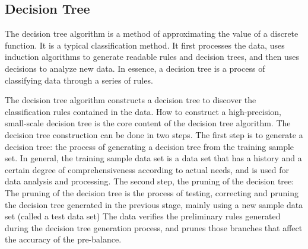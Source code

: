 \documentclass{article}
\begin{document}
\subsection{Decision Tree}
The decision tree algorithm is a method of approximating the value of a discrete function. It is a typical classification method. It first processes the data, uses induction algorithms to generate readable rules and decision trees, and then uses decisions to analyze new data. In essence, a decision tree is a process of classifying data through a series of rules.

The decision tree algorithm constructs a decision tree to discover the classification rules contained in the data. How to construct a high-precision, small-scale decision tree is the core content of the decision tree algorithm. The decision tree construction can be done in two steps. The first step is to generate a decision tree: the process of generating a decision tree from the training sample set. In general, the training sample data set is a data set that has a history and a certain degree of comprehensiveness according to actual needs, and is used for data analysis and processing. The second step, the pruning of the decision tree: The pruning of the decision tree is the process of testing, correcting and pruning the decision tree generated in the previous stage, mainly using a new sample data set (called a test data set) The data verifies the preliminary rules generated during the decision tree generation process, and prunes those branches that affect the accuracy of the pre-balance.
\end{document}
